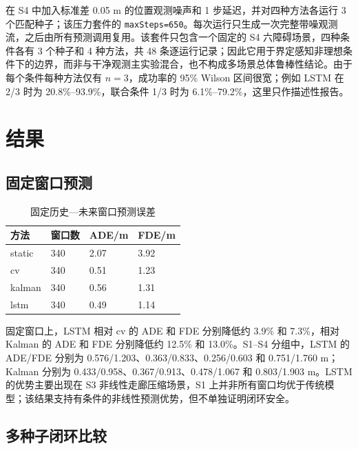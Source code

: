 \documentclass[10pt,a4paper,twocolumn]{ctexart}
\begin{document}
在 S4 中加入标准差 0.05 m 的位置观测噪声和 1 步延迟，并对四种方法各运行 3 个匹配种子；该压力套件的 \texttt{maxSteps=650}。每次运行只生成一次完整带噪观测流，之后由所有预测调用复用。该套件只包含一个固定的 S4 六障碍场景，四种条件各有 3 个种子和 4 种方法，共 48 条逐运行记录；因此它用于界定感知非理想条件下的边界，而非与干净观测主实验混合，也不构成多场景总体鲁棒性结论。由于每个条件每种方法仅有 $n=3$，成功率的 95\% Wilson 区间很宽；例如 LSTM 在 2/3 时为 20.8\%–93.9\%，联合条件 1/3 时为 6.1\%–79.2\%，这里只作描述性报告。

\section{结果}

\subsection{固定窗口预测}

\begin{table}[t]
\centering
\small
\caption{固定历史—未来窗口预测误差}
\label{tab:table-2}
\begin{tabularx}{\textwidth}{YYYY}
\toprule
方法 & 窗口数 & ADE/m & FDE/m \\
\midrule
static & 340 & 2.07 & 3.92 \\
cv & 340 & 0.51 & 1.23 \\
kalman & 340 & 0.56 & 1.31 \\
lstm & 340 & 0.49 & 1.14 \\
\bottomrule
\end{tabularx}
\end{table}

固定窗口上，LSTM 相对 cv 的 ADE 和 FDE 分别降低约 3.9\% 和 7.3\%，相对 Kalman 的 ADE 和 FDE 分别降低约 12.5\% 和 13.0\%。S1–S4 分组中，LSTM 的 ADE/FDE 分别为 0.576/1.203、0.363/0.833、0.256/0.603 和 0.751/1.760 m；Kalman 分别为 0.433/0.958、0.367/0.913、0.478/1.067 和 0.803/1.903 m。LSTM 的优势主要出现在 S3 非线性走廊压缩场景，S1 上并非所有窗口均优于传统模型；该结果支持有条件的非线性预测优势，但不单独证明闭环安全。

\subsection{多种子闭环比较}
\end{document}
